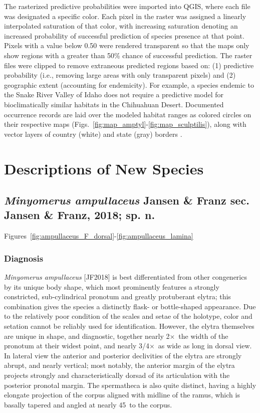 \documentclass[fleqn,10pt,lineno]{wlpeerj} %
\newcommand{\td}{\textdegree~}
\newcommand{\x}{$\times$~}
\begin{document}
		The rasterized predictive probabilities were imported into QGIS, where each file was designated a specific color. 
		Each pixel in the raster was assigned a linearly interpolated saturation of that color, with increasing saturation denoting an increased probability of successful prediction of species presence at that point.
		Pixels with a value below 0.50 were rendered transparent so that the maps only show regions with a greater than 50\% chance of successful prediction.
		The raster files were clipped to remove extraneous predicted regions based on: (1) predictive probability (i.e., removing large areas with only transparent pixels) and (2) geographic extent (accounting for endemicity).
		For example, a species endemic to the Snake River Valley of Idaho does not require a predictive model for bioclimatically similar habitats in the Chihuahuan Desert.
		Documented occurrence records are laid over the modeled habitat ranges as colored circles on their respective maps (Figs.~\ref{fig:map_amptyl}-\ref{fig:map_sculptilis}), along with vector layers of country (white) and state (gray) borders \citep{hijmans2012}.
		
\section*{Descriptions of New Species}\label{sec:nsp} 
	\subsection*{\textit{Minyomerus ampullaceus} Jansen \& Franz sec. Jansen \& Franz, 2018; sp. n.}\label{ssec:amp}
		Figures~\ref{fig:ampullaceus_F_dorsal}-\ref{fig:ampullaceus_lamina}
		\subsubsection*{Diagnosis}
			\textit{Minyomerus ampullaceus} [JF2018] is best differentiated from other congenerics by its unique body shape, which most prominently features a strongly constricted, sub-cylindrical pronotum and greatly protuberant elytra; this combination gives the species a distinctly flask- or bottle-shaped appearance.
			Due to the relatively poor condition of the scales and setae of the holotype, color and setation cannot be reliably used for identification.
			However, the elytra themselves are unique in shape, and diagnostic, together nearly 2\x the width of the pronotum at their widest point, and nearly 3/4\x as wide as long in dorsal view.
			In lateral view the anterior and posterior declivities of the elytra are strongly abrupt, and nearly vertical; most notably, the anterior margin of the elytra projects strongly and characteristically dorsad of its articulation with the posterior pronotal margin.
			The spermatheca is also quite distinct, having a highly elongate projection of the corpus aligned with midline of the ramus, which is basally tapered and angled at nearly 45\td to the corpus.
\end{document}
